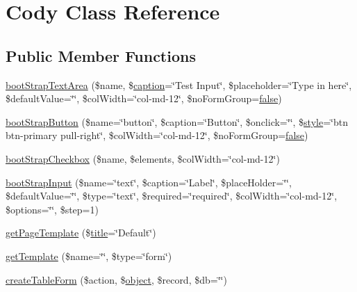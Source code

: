 \hypertarget{classCody}{}\section{Cody Class Reference}
\label{classCody}
\subsection*{Public Member Functions}
\begin{DoxyCompactItemize}
\item 
\hyperlink{classCody_aa2995d370fea29cedab1eed4dd166f8b}{boot\+Strap\+Text\+Area} (\$name, \$\hyperlink{Shape_8php_af310fcd32ca64d696b944cf99bf602ff}{caption}=\char`\"{}Test Input\char`\"{}, \$placeholder=\char`\"{}Type in here\char`\"{}, \$default\+Value=\char`\"{}\char`\"{}, \$col\+Width=\char`\"{}col-\/md-\/12\char`\"{}, \$no\+Form\+Group=\hyperlink{tina4_8php_aec2deb5590a84bee262c3bea206ae88f}{false})
\item 
\hyperlink{classCody_a97155a3cb1c7b9e33e0d64229a8a6cbe}{boot\+Strap\+Button} (\$name=\char`\"{}button\char`\"{}, \$caption=\char`\"{}Button\char`\"{}, \$onclick=\char`\"{}\char`\"{}, \$\hyperlink{Shape_8php_aa43717795ebf0302891b9f9d9bf4ca9d}{style}=\char`\"{}btn btn-\/primary pull-\/right\char`\"{}, \$col\+Width=\char`\"{}col-\/md-\/12\char`\"{}, \$no\+Form\+Group=\hyperlink{tina4_8php_aec2deb5590a84bee262c3bea206ae88f}{false})
\item 
\hyperlink{classCody_a45e229b7967b4e124471055f4b311a55}{boot\+Strap\+Checkbox} (\$name, \$elements, \$col\+Width=\char`\"{}col-\/md-\/12\char`\"{})
\item 
\hyperlink{classCody_a22dc3bebf4ba3deec1837ab58f6bc209}{boot\+Strap\+Input} (\$name=\char`\"{}text\char`\"{}, \$caption=\char`\"{}Label\char`\"{}, \$place\+Holder=\char`\"{}\char`\"{}, \$default\+Value=\char`\"{}\char`\"{}, \$type=\char`\"{}text\char`\"{}, \$required=\char`\"{}required\char`\"{}, \$col\+Width=\char`\"{}col-\/md-\/12\char`\"{}, \$options=\char`\"{}\char`\"{}, \$step=1)
\item 
\hyperlink{classCody_ab057111a248c76bd14a343324cec432e}{get\+Page\+Template} (\$\hyperlink{Shape_8php_ad264ad0cabbe965bf7f7c8a5ed6abebb}{title}=\char`\"{}Default\char`\"{})
\item 
\hyperlink{classCody_a6a0695d4357474925cd6f42e5ce5b248}{get\+Template} (\$name=\char`\"{}\char`\"{}, \$type=\char`\"{}form\char`\"{})
\item 
\hyperlink{classCody_a6ffe5d421ef90aebaedeb33bcc6bcc3e}{create\+Table\+Form} (\$action, \$\hyperlink{Shape_8php_a774642dc290de09e3aff55c8b594113f}{object}, \$record, \$db=\char`\"{}\char`\"{})

\end{DoxyCompactItemize}
